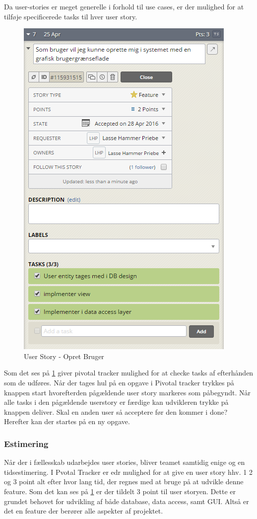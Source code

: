  Da user-stories er meget generelle i forhold til use cases, er der mulighed for at tilføje specificerede tasks til hver user story.

\begin{figure}
\centering
\includegraphics[width=0.6\linewidth]{figs/processProjektGennemforsel/userstory_with_tasks.PNG}
\caption{User Story - Opret Bruger}
\label{fig:userstory_with_tasks}
\end{figure}

Som det ses på \ref{fig:userstory_with_tasks} giver pivotal tracker mulighed for at checke tasks af efterhånden som de udføres. Når der tages hul på en opgave i Pivotal tracker trykkes på knappen start hvorefterden pågældende user story markeres som påbegyndt. Når alle tasks i den pågældende userstory er færdige kan udvikleren trykke på knappen deliver. Skal en anden user så acceptere før den kommer i done? Herefter kan der startes på en ny opgave.

\subsubsection{Estimering}
Når der i fællesskab udarbejdes user stories, bliver teamet samtidig enige og en tidsestimering. I Pvotal Tracker er edr mulighed for at give en user story hhv. 1 2 og 3 point alt efter hvor lang tid, der regnes med at bruge på at udvikle denne feature.  Som det kan ses på \ref{fig:userstory_with_tasks} er der tildelt 3 point til user storyen. Dette er grundet behovet for udvikling af både database, data access, samt GUI. Altså er det en feature der berører alle aspekter af projektet.

